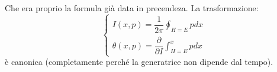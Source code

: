 \documentclass[a4paper,openany]{article}
\begin{document}
	Che era proprio la formula già data in precendeza. La trasformazione:
	\begin{equation}\label{key}
		\begin{cases}
			I(x,p)  = \dfrac{1}{2\pi}\oint_{H=E}pdx \\[6pt]
			\theta(x,p) = \dfrac{\partial}{\partial I}\int_{H=E}^{x}pdx
		\end{cases}
	\end{equation}
	è canonica (completamente perché la generatrice non dipende dal tempo).
\end{document}
